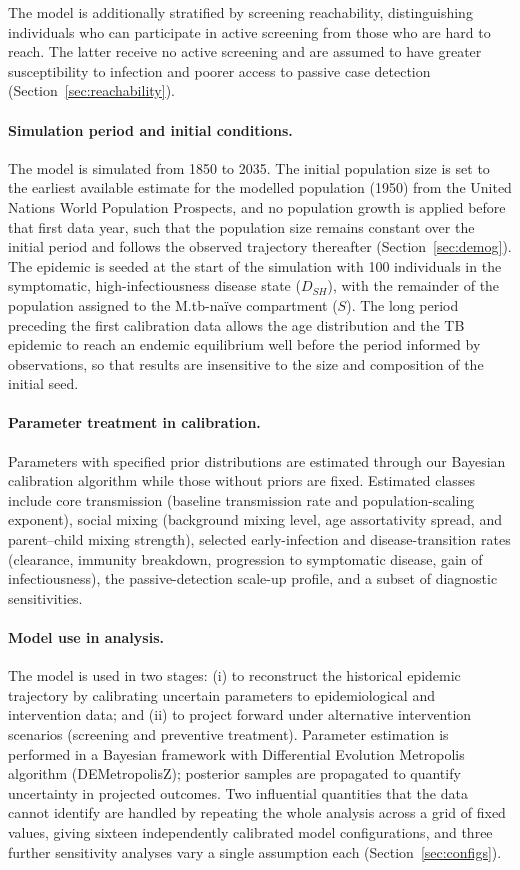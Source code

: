 \documentclass[11pt]{article}
\begin{document}
The model is additionally stratified by screening reachability, distinguishing individuals who can participate in active screening from those who are hard to reach. The latter receive no active screening and are assumed to have greater susceptibility to infection and poorer access to passive case detection (Section~\ref{sec:reachability}).

\paragraph{Simulation period and initial conditions.}
The model is simulated from 1850 to 2035. The initial population size is set to the earliest available estimate for the modelled population (1950) from the United Nations World Population Prospects, and no population growth is applied before that first data year, such that the population size remains constant over the initial period and follows the observed trajectory thereafter (Section~\ref{sec:demog}).
The epidemic is seeded at the start of the simulation with 100 individuals in the symptomatic, high-infectiousness disease state (\(D_{SH}\)), with the remainder of the population assigned to the M.tb-na\"ive compartment (\(S\)).
The long period preceding the first calibration data allows the age distribution and the TB epidemic to reach an endemic equilibrium well before the period informed by observations, so that results are insensitive to the size and composition of the initial seed.

\paragraph{Parameter treatment in calibration.}
Parameters with specified prior distributions are estimated through our Bayesian calibration algorithm while those without priors are fixed. 
Estimated classes include core transmission (baseline transmission rate and population-scaling exponent), social mixing (background mixing level, age assortativity spread, and parent–child mixing strength), selected early-infection and disease-transition rates (clearance, immunity breakdown, progression to symptomatic disease, gain of infectiousness), the passive-detection scale-up profile, and a subset of diagnostic sensitivities. 

\paragraph{Model use in analysis.}
The model is used in two stages: (i) to reconstruct the historical epidemic trajectory by calibrating uncertain parameters to epidemiological and intervention data; and (ii) to project forward under alternative intervention scenarios (screening and preventive treatment). Parameter estimation is performed in a Bayesian framework with Differential Evolution Metropolis algorithm (DEMetropolisZ); posterior samples are propagated to quantify uncertainty in projected outcomes.
Two influential quantities that the data cannot identify are handled by repeating the whole analysis across a grid of fixed values, giving sixteen independently calibrated model configurations, and three further sensitivity analyses vary a single assumption each (Section~\ref{sec:configs}).
\end{document}
